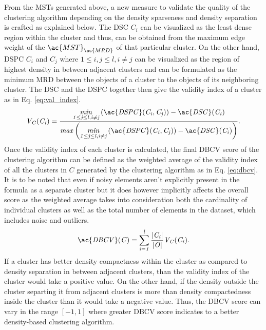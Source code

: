 From the \ac{MST}s generated above, a new measure to validate the quality of the clustering algorithm depending on the density sparseness and density separation is crafted as explained below. The \ac{DSC} $C_i$ can be visualized as the least dense region within the cluster and thus, can be obtained from the maximum edge weight of the $\ac{MST}_{\ac{MRD}}$ of that particular cluster. On the other hand, \ac{DSPC} $C_i$ and $C_j$ where $1 \leq i,j \leq l, i \neq j$  can be visualized as the region of highest density in between adjacent clusters and can be formulated as the minimum \ac{MRD} between the objects of a cluster to the objects of its neighboring cluster. The \ac{DSC} and the \ac{DSPC} together then give the validity index of a cluster as in Eq. \ref{eq:val_index}.
\begin{equation}
  \label{eq:val_index}
  \mathit{V_C(C_i)} = \mathit{\frac{\underset{1 \leq j \leq l, i \neq j}{min}\left(\ac{DSPC}(C_i,C_j)\right) - \ac{DSC}(C_i)}{max\left(\underset{1 \leq j \leq l, i \neq j}{min}\left(\ac{DSPC}(C_i,C_j)\right) - \ac{DSC}(C_i)\right)}}.
\end{equation}
Once the validity index of each cluster is calculated, the final \ac{DBCV} score of the clustering algorithm can be defined as the weighted average of the validity index of all the clusters in $C$ generated by the clustering algorithm as in Eq. \ref{eq:dbcv}. It is to be noted that even if noisy elements aren't explicitly present in the formula as a separate cluster but it does however implicitly affects the overall score as the weighted average takes into consideration both the cardinality of individual clusters as well as the total number of elements in the dataset, which includes noise and outliers. 
\begin{equation}
  \label{eq:dbcv}
  \mathit{\ac{DBCV}(C)} = \mathit{\sum_{i=1}^{l}\frac{|C_i|}{|O|}V_C(C_i)}.
\end{equation}
If a cluster has better density compactness within the cluster as compared to density separation in between adjacent clusters, than the validity index of the cluster would take a positive value. On the other hand, if the density outside the cluster separting it from adjacent clusters is more than density compactedness inside the cluster than it would take a negative value. Thus, the \ac{DBCV} score can vary in the range $[-1,1]$ where greater \ac{DBCV} score indicates to a better density-based clustering algorithm.

